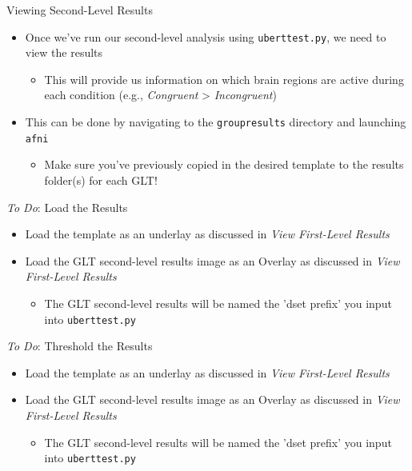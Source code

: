 \documentclass[t,12pt]{beamer}
\begin{document}
\begin{frame}{Viewing Second-Level Results}
\vspace{10pt}
\begin{itemize}
\setlength\itemsep{1em}
\item Once we've run our second-level analysis using \texttt{uber\textunderscore{}ttest.py}, we need to view the results
\vspace{4pt}
\begin{itemize}
\item This will provide us information on which brain regions are active during each condition (e.g., \textit{Congruent} > \textit{Incongruent})
\end{itemize}
\item This can be done by navigating to the \texttt{group\textunderscore{}results} directory and launching \texttt{afni}
\vspace{4pt}
\begin{itemize}
\item Make sure you've previously copied in the desired template to the results folder(s) for each GLT!
\end{itemize}
\end{itemize}
\end{frame}

\begin{frame}{\emph{To Do}: Load the Results}
\vspace{10pt}
\begin{itemize}
\setlength\itemsep{1em}
\item Load the template as an underlay as discussed in \textit{View First-Level Results}
\item Load the GLT second-level results image as an Overlay as discussed in \textit{View First-Level Results}
\vspace{4pt}
\begin{itemize}
\item The GLT second-level results will be named the 'dset prefix' you input into \texttt{uber\textunderscore{}ttest.py}
\end{itemize}
\end{itemize}
\end{frame}

\begin{frame}{\emph{To Do}: Threshold the Results}
\vspace{10pt}
\begin{itemize}
\setlength\itemsep{1em}
\item Load the template as an underlay as discussed in \textit{View First-Level Results}
\item Load the GLT second-level results image as an Overlay as discussed in \textit{View First-Level Results}
\vspace{4pt}
\begin{itemize}
\item The GLT second-level results will be named the 'dset prefix' you input into \texttt{uber\textunderscore{}ttest.py}
\end{itemize}
\end{itemize}
\end{frame}
\end{document}
